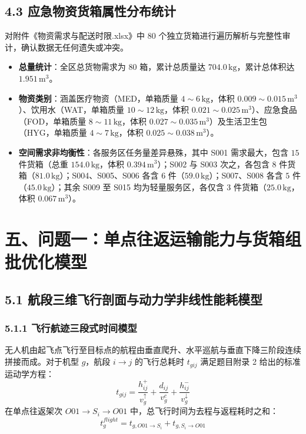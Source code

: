 \documentclass[withoutpreface,bwprint]{format}
\begin{document}
\subsection{4.3 应急物资货箱属性分布统计}
对附件《物资需求与配送时限.xlsx》中 $80$ 个独立货箱进行遍历解析与完整性审计，确认数据无任何遗失或冲突。
\begin{itemize}[leftmargin=*]
    \item \textbf{总量统计}：全区总货物需求为 $80$ 箱，累计总质量达 $704.0\,\text{kg}$，累计总体积达 $1.951\,\text{m}^3$。
    \item \textbf{物资类别}：涵盖医疗物资（MED，单箱质量 $4\sim 6\,\text{kg}$，体积 $0.009\sim 0.015\,\text{m}^3$）、饮用水（WAT，单箱质量 $10\sim 12\,\text{kg}$，体积 $0.021\sim 0.025\,\text{m}^3$）、应急食品（FOD，单箱质量 $8\sim 11\,\text{kg}$，体积 $0.027\sim 0.035\,\text{m}^3$）及生活卫生包（HYG，单箱质量 $4\sim 7\,\text{kg}$，体积 $0.025\sim 0.038\,\text{m}^3$）。
    \item \textbf{空间需求非均衡性}：各服务区任务量差异悬殊，其中 S001 需求最大，包含 $15$ 件货箱（总重 $154.0\,\text{kg}$，体积 $0.394\,\text{m}^3$）；S002 与 S003 次之，各包含 $8$ 件货箱（$81.0\,\text{kg}$）；S004、S005、S006 各含 $6$ 件（$59.0\,\text{kg}$）；S007、S008 各含 $5$ 件（$45.0\,\text{kg}$）；其余 S009 至 S015 均为轻量服务区，各仅含 $3$ 件货箱（$25.0\,\text{kg}$，体积 $0.067\,\text{m}^3$）。
\end{itemize}



\section{五、问题一：单点往返运输能力与货箱组批优化模型}

\subsection{5.1 航段三维飞行剖面与动力学非线性能耗模型}

\subsubsection{5.1.1 飞行航迹三段式时间模型}
无人机由起飞点飞行至目标点的航程由垂直爬升、水平巡航与垂直下降三阶段连续拼接而成。对于机型 $g$，航段 $i \to j$ 的飞行总耗时 $t_{gij}$ 满足题目附录 2 给出的标准运动学方程：
\begin{equation}
t_{gij} = \frac{h_{ij}^+}{v_g^\uparrow} + \frac{d_{ij}}{v_g^c} + \frac{h_{ij}^-}{v_g^\downarrow}
\end{equation}
在单点往返架次 $O01 \to S_i \to O01$ 中，总飞行时间为去程与返程耗时之和：
\begin{equation}
t_g^{flight} = t_{g, O01 \to S_i} + t_{g, S_i \to O01}
\end{equation}
\end{document}
